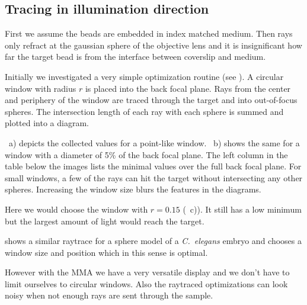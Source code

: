 \subsection{Tracing in illumination direction}

First we assume the beads are embedded in index matched medium. Then
rays only refract at the gaussian sphere of the objective lens and it
is insignificant how far the target bead is from the interface between
coverslip and medium.

Initially we investigated a very simple optimization routine (see
). A circular
window with radius $r$ is placed into the back focal plane. Rays from
the center and periphery of the window are traced through the target
and into out-of-focus spheres. The intersection length of each ray
with each sphere is summed and plotted into a diagram.

~a) depicts
the collected values for a point-like window.
~b) shows the
same for a window with a diameter of 5\% of the back focal plane. The
left column in the table below the images lists the minimal values
over the full back focal plane. For small windows, a few of the rays
can hit the target without intersecting any other spheres. Increasing
the window size blurs the features in the diagrams.

Here we would choose the window with $r=0.15$
(~c)). It
still has a low minimum but the largest amount of light would reach
the target.


 shows a similar
raytrace for a sphere model of a \emph{C.~elegans} embryo and chooses
a window size and position which in this sense is optimal.

However with the MMA we have a very versatile display and we don't
have to limit ourselves to circular windows. Also the raytraced
optimizations can look noisy when not enough rays are sent through the
sample.
